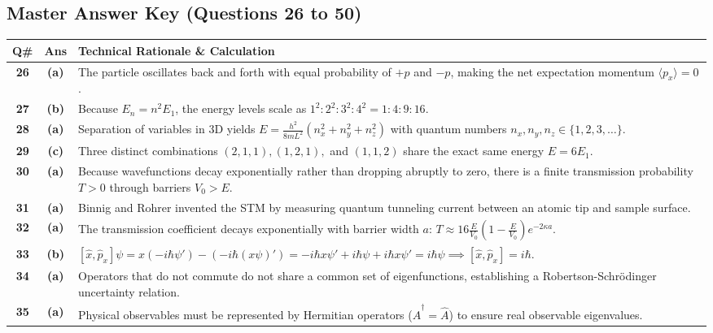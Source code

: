 \newpage

\subsection*{Master Answer Key (Questions 26 to 50)}

{\small
\noindent\begin{tabularx}{\textwidth}{|c|c|X|}
\hline
\textbf{Q\#} & \textbf{Ans} & \textbf{Technical Rationale \& Calculation} \\
\hline
\textbf{26} & \textbf{(a)} & The particle oscillates back and forth with equal probability of $+p$ and $-p$, making the net expectation momentum $\langle p_x \rangle = 0$. \\ \hline
\textbf{27} & \textbf{(b)} & Because $E_n = n^2 E_1$, the energy levels scale as $1^2 : 2^2 : 3^2 : 4^2 = 1 : 4 : 9 : 16$. \\ \hline
\textbf{28} & \textbf{(a)} & Separation of variables in 3D yields $E = \frac{h^2}{8mL^2}(n_x^2 + n_y^2 + n_z^2)$ with quantum numbers $n_x, n_y, n_z \in \{1, 2, 3,\dots\}$. \\ \hline
\textbf{29} & \textbf{(c)} & Three distinct combinations $(2,1,1), (1,2,1),$ and $(1,1,2)$ share the exact same energy $E = 6E_1$. \\ \hline
\textbf{30} & \textbf{(a)} & Because wavefunctions decay exponentially rather than dropping abruptly to zero, there is a finite transmission probability $T > 0$ through barriers $V_0 > E$. \\ \hline
\textbf{31} & \textbf{(a)} & Binnig and Rohrer invented the STM by measuring quantum tunneling current between an atomic tip and sample surface. \\ \hline
\textbf{32} & \textbf{(a)} & The transmission coefficient decays exponentially with barrier width $a$: $T \approx 16\frac{E}{V_0}(1 - \frac{E}{V_0})e^{-2\kappa a}$. \\ \hline
\textbf{33} & \textbf{(b)} & $[\hat{x}, \hat{p}_x]\psi = x(-i\hbar \psi') - (-i\hbar (x\psi)') = -i\hbar x \psi' + i\hbar \psi + i\hbar x \psi' = i\hbar \psi \implies [\hat{x}, \hat{p}_x] = i\hbar$. \\ \hline
\textbf{34} & \textbf{(a)} & Operators that do not commute do not share a common set of eigenfunctions, establishing a Robertson-Schrödinger uncertainty relation. \\ \hline
\textbf{35} & \textbf{(a)} & Physical observables must be represented by Hermitian operators ($\hat{A}^\dagger = \hat{A}$) to ensure real observable eigenvalues. \\ \hline

\end{tabularx}}

